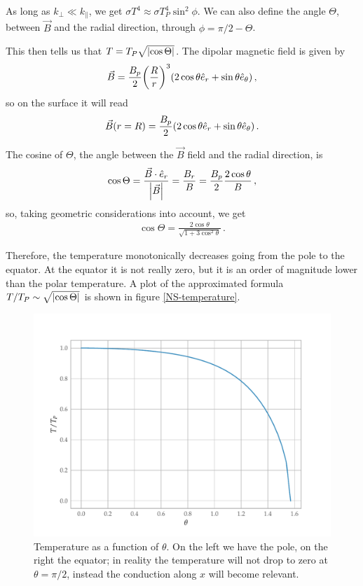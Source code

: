 \documentclass[main.tex]{subfiles}
\begin{document}
As long as \(k_\perp \ll k_\parallel\), we get \(\sigma T^{4} \approx \sigma T_P^{4} \sin^2 \phi \).
We can also define the angle \(\Theta \), between \(\vec{B}\) and the radial direction, through \(\phi = \pi /2 - \Theta \).

This then tells us that \(T = T_P \sqrt{\abs{\cos \Theta }}\).
The dipolar magnetic field is given by 
%
\begin{align}
\vec{B} = \frac{B_p}{2} \qty(\frac{R}{r})^3 \qty(2 \cos \theta \hat{e}_r + \sin \theta \hat{e}_\theta )
\,,
\end{align}
%
so on the surface it will read
%
\begin{align}
\vec{B}(r = R) = \frac{B_p}{2} \qty(2 \cos \theta \hat{e}_r + \sin \theta \hat{e}_\theta )
\,.
\end{align}

The cosine of \(\Theta \), the angle between the \(\vec{B}\) field and the radial direction, is 
%
\begin{align}
\cos \Theta = \frac{\vec{B} \cdot \hat{e}_r}{\abs{\vec{B}}} = \frac{B_r}{B} = \frac{B_p}{2} \frac{2 \cos \theta }{B} 
\,,
\end{align}
%
so, taking geometric considerations into account, we get 
%
\begin{align}
\cos \Theta = \frac{2 \cos \theta }{\sqrt{1 + 3 \cos^2 \theta }}
\,.
\end{align}

Therefore, the temperature monotonically decreases going from the pole to the equator. 
At the equator it is not really zero, but it is an order of magnitude lower than the polar temperature. A plot of the approximated formula \(T/ T_P \sim \sqrt{\abs{\cos \Theta }}\) is shown in figure \ref{NS-temperature}.

\begin{figure}[H]
\centering
\includegraphics[width=.7\textwidth]{figures/NS-temperature}
\caption{Temperature as a function of \(\theta \). On the left we have the pole, on the right the equator; in reality the temperature will not drop to zero at \(\theta = \pi /2\), instead the conduction along \(x\) will become relevant.}
\label{fig:NS-temperature}
\end{figure}
\end{document}
